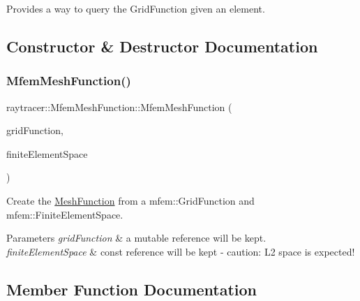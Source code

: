 Provides a way to query the Grid\+Function given an element. 

\subsection{Constructor \& Destructor Documentation}
\mbox{\label{classraytracer_1_1MfemMeshFunction_a92a9d86fa4b15e3514e15ad50d534bf6}} 
\subsubsection{\texorpdfstring{Mfem\+Mesh\+Function()}{MfemMeshFunction()}}
{\footnotesize\ttfamily raytracer\+::\+Mfem\+Mesh\+Function\+::\+Mfem\+Mesh\+Function (\begin{DoxyParamCaption}\item[{mfem\+::\+Grid\+Function \&}]{grid\+Function,  }\item[{const mfem\+::\+Finite\+Element\+Space \&}]{finite\+Element\+Space }\end{DoxyParamCaption})\hspace{0.3cm}{\ttfamily [explicit]}}



Create the \hyperlink{classraytracer_1_1MeshFunction}{Mesh\+Function} from a mfem\+::\+Grid\+Function and mfem\+::\+Finite\+Element\+Space. 


\begin{DoxyParams}{Parameters}
{\em grid\+Function} & a mutable reference will be kept. \\
\hline
{\em finite\+Element\+Space} & const reference will be kept -\/ caution\+: L2 space is expected! \\
\hline
\end{DoxyParams}


\subsection{Member Function Documentation}
\mbox{\label{classraytracer_1_1MfemMeshFunction_a1c9f0ec943afb1d069ddeb85ee9bb2c8}} 
